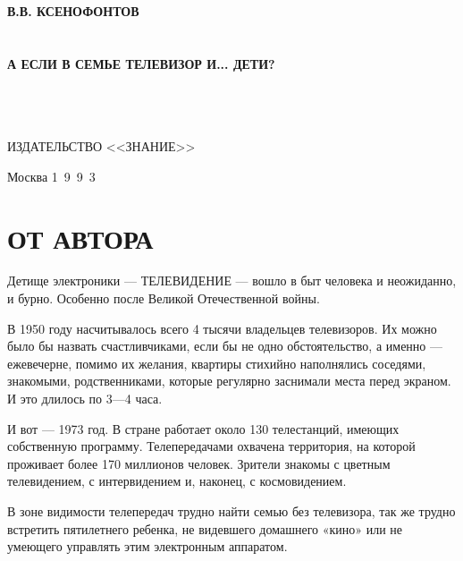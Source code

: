 \documentclass[12pt, a4paper, openany]{book}
\begin{document}
	
	\begin{titlepage}
		
		\begin{center}
			\vspace*{\fill}
			
			
			{\large\bf В.В. КСЕНОФОНТОВ\\}
			\ \\
			\ \\
			{\Huge\bf А ЕСЛИ В СЕМЬЕ ТЕЛЕВИЗОР И... ДЕТИ?\\}
			\ \\
			\ \\
			\ \\
			\vspace*{\fill}
			
			\vfill
			
			
			ИЗДАТЕЛЬСТВО <<ЗНАНИЕ>>
			
			Москва 1\ 9\ 9\ 3
			

		\end{center}
		
	\end{titlepage}
	
	\thispagestyle{empty} %
	
	\newpage
	

\setcounter{secnumdepth}{0}
	
	\section[От автора]{\center \textbf{ОТ АВТОРА}}
	
Детище электроники — ТЕЛЕВИДЕНИЕ — вошло в быт человека и неожиданно, и бурно. Особенно после Великой Отечественной войны. 

В 1950 году насчитывалось всего 4 тысячи владельцев телевизоров. Их можно было бы назвать счастливчиками, если бы не одно обстоятельство, а именно — ежевечерне, помимо их желания, квартиры стихийно наполнялись соседями, знакомыми, родственниками, которые регулярно заснимали места перед экраном. И это длилось по 3—4 часа. 

И вот — 1973 год. В стране работает около 130 телестанций, имеющих собственную программу. Телепередачами охвачена территория, на которой проживает более 170 миллионов человек. Зрители знакомы с цветным телевидением, с интервидением и, наконец, с космовидением. 

В зоне видимости телепередач трудно найти семью без телевизора, так же трудно встретить пятилетнего ребенка, не видевшего домашнего «кино» или не умеющего управлять этим электронным аппаратом. 
\end{document}
